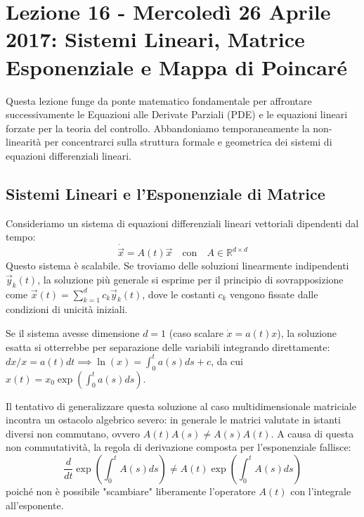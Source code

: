 \documentclass[12pt,a4paper]{article}
\begin{document}
\section{Lezione 16 - Mercoledì 26 Aprile 2017: Sistemi Lineari, Matrice Esponenziale e Mappa di Poincaré}

Questa lezione funge da ponte matematico fondamentale per affrontare successivamente le Equazioni alle Derivate Parziali (PDE) e le equazioni lineari forzate per la teoria del controllo. Abbandoniamo temporaneamente la non-linearità per concentrarci sulla struttura formale e geometrica dei sistemi di equazioni differenziali lineari.

\subsection{Sistemi Lineari e l'Esponenziale di Matrice}
Consideriamo un sistema di equazioni differenziali lineari vettoriali dipendenti dal tempo:
\begin{equation}
\dot{\vec{x}} = A(t)\vec{x} \quad \text{con} \quad A \in \mathbb{R}^{d \times d}
\end{equation}
Questo sistema è scalabile. Se troviamo delle soluzioni linearmente indipendenti $\vec{y}_k(t)$, la soluzione più generale si esprime per il principio di sovrapposizione come $\vec{x}(t) = \sum_{k=1}^d c_k \vec{y}_k(t)$, dove le costanti $c_k$ vengono fissate dalle condizioni di unicità iniziali.

Se il sistema avesse dimensione $d=1$ (caso scalare $\dot{x} = a(t)x$), la soluzione esatta si otterrebbe per separazione delle variabili integrando direttamente: $dx/x = a(t)dt \implies \ln(x) = \int_0^t a(s)ds + c$, da cui $x(t) = x_0 \exp\left(\int_0^t a(s)ds\right)$.

Il tentativo di generalizzare questa soluzione al caso multidimensionale matriciale incontra un ostacolo algebrico severo: in generale le matrici valutate in istanti diversi non commutano, ovvero $A(t)A(s) \neq A(s)A(t)$. A causa di questa non commutatività, la regola di derivazione composta per l'esponenziale fallisce:
\begin{equation}
\frac{d}{dt} \exp\left( \int_0^t A(s)ds \right) \neq A(t) \exp\left( \int_0^t A(s)ds \right)
\end{equation}
poiché non è possibile "scambiare" liberamente l'operatore $A(t)$ con l'integrale all'esponente.
\end{document}
